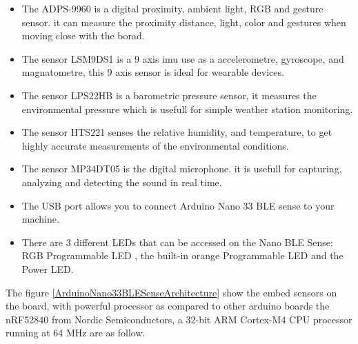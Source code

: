 \begin{itemize}
    \item The ADPS-9960 is a digital proximity, ambient light, RGB and gesture sensor. it can measure the proximity distance, light, color and gestures when moving close with the borad.
    \item The sensor LSM9DS1 is a 9 axis \ac{imu} use as a accelerometre, gyroscope, and magnatometre, this 9 axis sensor is ideal for wearable devices.
    \item The sensor LPS22HB is a barometric pressure sensor, it measures the environmental pressure which is usefull for simple weather station monitoring. 
    \item The sensor HTS221 senses the relative humidity, and temperature, to get highly accurate measurements of the environmental conditions.
    \item The sensor MP34DT05 is the digital microphone. it is usefull for capturing, analyzing and detecting the sound in real time.
    \item The USB port allows you to connect  Arduino Nano 33 BLE sense to your machine.
    \item There are 3 different LEDs that can be accessed on the Nano BLE Sense: RGB Programmable LED , the built-in  orange Programmable LED and the Power LED.
    
\end{itemize}

The figure \ref{ArduinoNano33BLESenseArchitecture} show the embed sensors on the board, with powerful processor as compared to other arduino boards the nRF52840 from Nordic Semiconductors, a 32-bit ARM\textsuperscript{\textregistered} Cortex\textsuperscript{\texttrademark}-M4 CPU processor running at 64 MHz are as follow.

